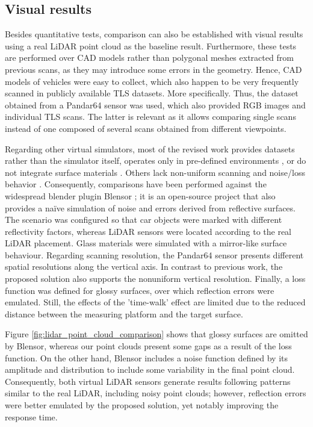 \subsection{Visual results}

Besides quantitative tests, comparison can also be established with visual results using a real LiDAR point cloud as the baseline result. Furthermore, these tests are performed over CAD models rather than polygonal meshes extracted from previous scans, as they may introduce some errors in the geometry. Hence, CAD models of vehicles were easy to collect, which also happen to be very frequently scanned in publicly available TLS datasets. More specifically. Thus, the dataset obtained from a Pandar64 sensor \cite{hesai_pandaset_2021} was used, which also provided RGB images and individual TLS scans. The latter is relevant as it allows comparing single scans instead of one composed of several scans obtained from different viewpoints. 

Regarding other virtual simulators, most of the revised work provides datasets rather than the simulator itself, operates only in pre-defined environments \cite{lg_electronics_rd_lab_lgsvl_2021}, or do not integrate surface materials \cite{yue_lidar_2018, xiao_synlidar_2021, manivasagam_lidarsim_2020, fang_augmented_2020, su_simulation_2019}. Others lack non-uniform scanning \cite{dosovitskiy_carla_2017} and noise/loss behavior \cite{shah_airsim_2017}. Consequently, comparisons have been performed against the widespread blender plugin Blensor \cite{gschwandtner_blensor_2011}; it is an open-source project that also provides a naïve simulation of noise and errors derived from reflective surfaces. The scenario was configured so that car objects were marked with different reflectivity factors, whereas LiDAR sensors were located according to the real LiDAR placement. Glass materials were simulated with a mirror-like surface behaviour. Regarding scanning resolution, the Pandar64 sensor presents different spatial resolutions along the vertical axis. In contrast to previous work, the proposed solution also supports the nonuniform vertical resolution. Finally, a loss function was defined for glossy surfaces, over which reflection errors were emulated. Still, the effects of the 'time-walk' effect are limited due to the reduced distance between the measuring platform and the target surface. 

Figure \ref{fig:lidar_point_cloud_comparison} shows that glossy surfaces are omitted by Blensor, whereas our point clouds present some gaps as a result of the loss function. On the other hand, Blensor includes a noise function defined by its amplitude and distribution to include some variability in the final point cloud. Consequently, both virtual LiDAR sensors generate results following patterns similar to the real LiDAR, including noisy point clouds; however, reflection errors were better emulated by the proposed solution, yet notably improving the response time.

